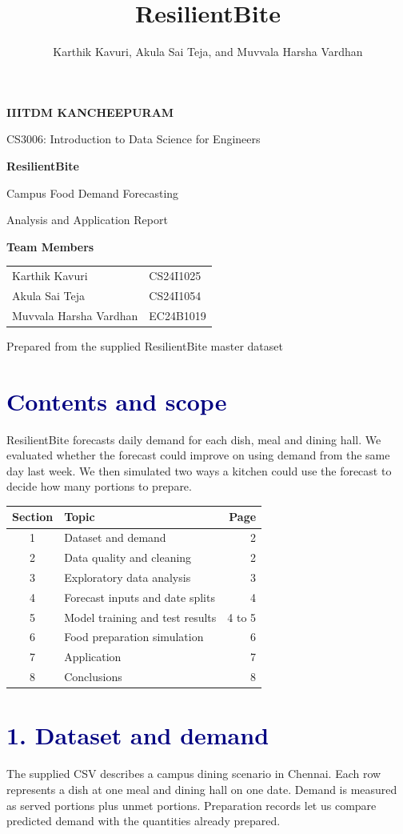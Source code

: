 \documentclass[11pt,a4paper]{article}
\title{ResilientBite}
\author{Karthik Kavuri, Akula Sai Teja, and Muvvala Harsha Vardhan}
\date{}
\newcommand{\phase}[1]{\section*{\textcolor{navy}{#1}}}
\begin{document}
\begin{center}
\vspace*{27mm}
{\Large\bfseries IIITDM KANCHEEPURAM\par}
\vspace{3mm}
{\large CS3006: Introduction to Data Science for Engineers\par}
\vspace{15mm}
{\Huge\bfseries ResilientBite\par}
\vspace{6mm}
{\Large Campus Food Demand Forecasting\par}
\vspace{11mm}
{\large Analysis and Application Report\par}
\vspace{12mm}
{\large\bfseries Team Members\par}
\vspace{3mm}
\begin{tabular}{@{}l@{\qquad}l@{}}
Karthik Kavuri & CS24I1025 \\
Akula Sai Teja & CS24I1054 \\
Muvvala Harsha Vardhan & EC24B1019
\end{tabular}\par
\vspace{22mm}
Prepared from the supplied ResilientBite master dataset
\end{center}
\clearpage
\phase{Contents and scope}
ResilientBite forecasts daily demand for each dish, meal and dining hall. We evaluated whether the forecast could improve on using demand from the same day last week. We then simulated two ways a kitchen could use the forecast to decide how many portions to prepare.

\begin{tabularx}{\linewidth}{@{}cXr@{}}
\toprule
\textbf{Section} & \textbf{Topic} & \textbf{Page} \\
\midrule
1 & Dataset and demand & 2 \\
2 & Data quality and cleaning & 2 \\
3 & Exploratory data analysis & 3 \\
4 & Forecast inputs and date splits & 4 \\
5 & Model training and test results & 4 to 5 \\
6 & Food preparation simulation & 6 \\
7 & Application & 7 \\
8 & Conclusions & 8 \\
\bottomrule
\end{tabularx}
\phase{1. Dataset and demand}
The supplied CSV describes a campus dining scenario in Chennai. Each row represents a dish at one meal and dining hall on one date. Demand is measured as served portions plus unmet portions. Preparation records let us compare predicted demand with the quantities already prepared.
\end{document}
